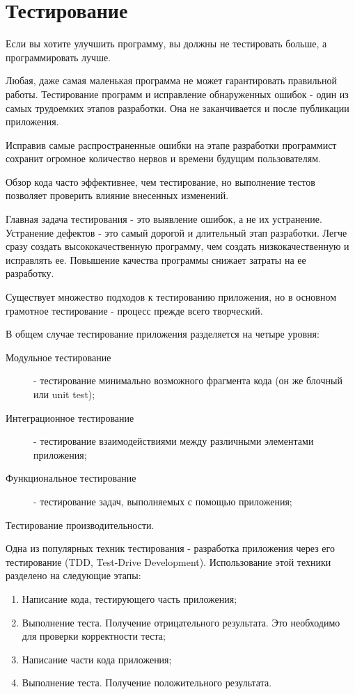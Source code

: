 \chapter{Тестирование}

\epigraph
{Если вы хотите улучшить программу, вы должны не тестировать больше, а программировать лучше.}{}

Любая, даже самая маленькая программа не может гарантировать правильной работы. Тестирование программ и исправление обнаруженных ошибок - один из самых трудоемких этапов разработки. Она не заканчивается и после публикации приложения. 

Исправив самые распространенные ошибки на этапе разработки программист сохранит огромное количество нервов и времени будущим пользователям. 

Обзор кода часто эффективнее, чем тестирование, но выполнение тестов позволяет проверить влияние внесенных изменений.

Главная задача тестирования - это выявление ошибок, а не их устранение. Устранение дефектов - это самый дорогой и длительный этап разработки. Легче сразу создать высококачественную программу, чем создать низкокачественную и исправлять ее. Повышение качества программы снижает затраты на ее разработку.

Существует множество подходов к тестированию приложения, но в основном грамотное тестирование - процесс прежде всего творческий.

В общем случае тестирование приложения разделяется на четыре уровня:
\begin{description}
  \item[Модульное тестирование] - тестирование минимально возможного фрагмента кода (он же блочный или unit test); 
  \item[Интеграционное тестирование] - тестирование взаимодействиями между различными элементами приложения; 
  \item[Функциональное тестирование] - тестирование задач, выполняемых с помощью приложения; 
  \item[Тестирование производительности.]
\end{description}

Одна из популярных техник тестирования - разработка приложения через его тестирование (TDD, Test-Drive Development). Использование этой техники разделено на следующие этапы: 
\begin{enumerate}
  \item Написание кода, тестирующего часть приложения; 
  \item Выполнение теста. Получение отрицательного результата. Это необходимо для проверки корректности теста; 
  \item Написание части кода приложения; 
  \item Выполнение теста. Получение положительного результата.
\end{enumerate}

